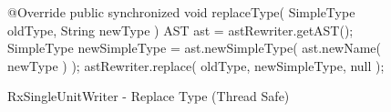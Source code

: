 \begin{figure}[H]
\begin{sourcecode}
\begin{javacode}{}
@Override
public synchronized void replaceType( SimpleType oldType, String newType ) {
	AST ast = astRewriter.getAST();
	SimpleType newSimpleType = ast.newSimpleType( ast.newName( newType ) );
	astRewriter.replace( oldType, newSimpleType, null );
}
\end{javacode}
\caption{\toolcore{} RxSingleUnitWriter - Replace Type (Thread Safe)}
\label{code:rxsingleunitwriter-threadsafe}
\end{sourcecode}
\end{figure}
